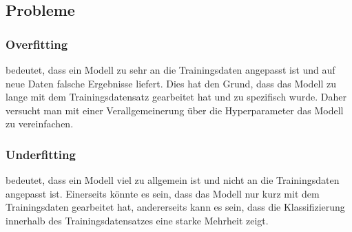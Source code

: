 \subsection{Probleme}

\subsubsection{Overfitting} \label{overfitting} bedeutet, dass ein Modell zu sehr an die Trainingsdaten angepasst ist und auf neue Daten falsche Ergebnisse liefert. Dies hat den Grund, dass das Modell zu lange mit dem Trainingsdatensatz gearbeitet hat und zu spezifisch wurde. Daher versucht man mit einer Verallgemeinerung über die Hyperparameter das Modell zu vereinfachen.

\subsubsection{Underfitting} bedeutet, dass ein Modell viel zu allgemein ist und nicht an die Trainingsdaten angepasst ist. Einerseits könnte es sein, dass das Modell nur kurz mit dem Trainingsdaten gearbeitet hat, andererseits kann es sein, dass die Klassifizierung innerhalb des Trainingsdatensatzes eine starke Mehrheit zeigt. \cite{OFUF}